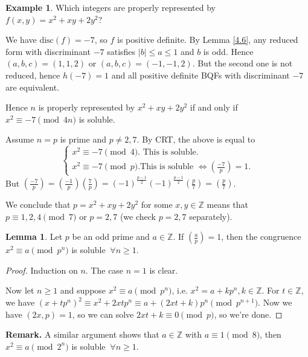 \documentclass{article}
\theoremstyle{definition}
\newtheorem{lemma}[theorem]{Lemma}
\newtheorem{example}{Example}[section]
\begin{document}
\begin{example}
    Which integers are properly represented by $f(x,y)={x^2+xy+2y^2}$?
    
    We have $\text{disc}(f)=-7$, so $f$ is positive definite. By Lemma \ref{4.6}, any reduced form with discriminant $-7$ satisfies $|b|\le a \le 1$ and $b$ is odd. Hence $(a,b,c)=(1,1,2)$ or $(a,b,c) = (-1,-1,2)$. But the second one is not reduced, hence $h(-7)=1$ and all positive definite BQFs with discriminant $-7$ are equivalent.
    \vspace{1mm}
    
    Hence $n$ is properly represented by $x^2+xy+2y^2$ if and only if $x^2 \equiv -7 \pmod{4n}$ is soluble.


    Assume $n=p$ is prime and $p \neq 2,7$. By CRT, the above is equal to 
    \[
    \begin{cases}
        x^2 \equiv -7 \pmod{4}. \text{ This is soluble.} \\
        x^2 \equiv  -7 \pmod{p}. \text{This is soluble }\iff \left(\frac{-7}{p} \right) = 1. 
    \end{cases}
    \]
    But $\left(\frac{-7}{p} \right)  = \left(\frac{-1}{p}\right)\left(\frac{7}{p}\right) = (-1)^{\frac{p-1}{2}}(-1)^{\frac{p-1}{2}}\left(\frac{p}{7}\right)=\left(\frac{p}{7}\right)$.

    We conclude that $p = x^2+xy+2y^2$ for some $x,y \in \mathbb{Z}$ means that $p \equiv 1,2,4 \pmod{7}$ or $p=2,7$ (we check $p=2,7$ separately).
\end{example}
\begin{lemma}
    Let $p$ be an odd prime and $a \in \mathbb{Z}$. If $\left(\frac{a}{p} \right) =1$, then the congruence $x^2 \equiv a \pmod{p^n}$ is soluble $~\forall n\ge 1$.
\end{lemma}
\begin{proof}
    Induction on $n$. The case $n=1$ is clear.
    \vspace{1mm}
    
    Now let $n\ge 1$ and suppose $x^2 \equiv a \pmod{p^n}$, i.e. $x^2 = a +k p^n, k \in \mathbb{Z}$. For $t \in \mathbb{Z}$, we have $(x + tp^n)^2 \equiv x^2 + 2xt p^n \equiv a + (2xt+k)p^n \pmod{p^{n+1}}$. Now we have $(2x,p)=1$, so we can solve $2xt+k \equiv 0\pmod{p}$, so we're done.
\end{proof}
\textbf{Remark.} A similar argument shows that $a \in \mathbb{Z}$ with $a \equiv 1\pmod{8}$, then $x^2 \equiv a \pmod{2^n}$ is soluble $~\forall n\ge 1$.
\end{document}
